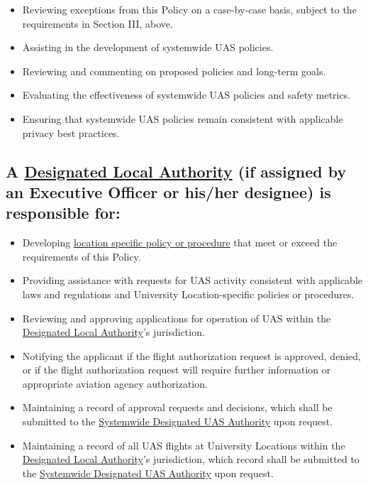 \documentclass[
]{book}
\providecommand{\tightlist}{%
  \setlength{\itemsep}{0pt}\setlength{\parskip}{0pt}}
\begin{document}
\begin{itemize}
\tightlist
\item
  Reviewing exceptions from this Policy on a case-by-case basis, subject to the requirements in Section III, above.
\item
  Assisting in the development of systemwide UAS policies.
\item
  Reviewing and commenting on proposed policies and long-term goals.
\item
  Evaluating the effectiveness of systemwide UAS policies and safety metrics.
\item
  Ensuring that systemwide UAS policies remain consistent with applicable privacy best practices.
\end{itemize}

\hypertarget{a-refdla-if-assigned-by-an-executive-officer-or-hisher-designee-is-responsible-for}{%
\subsection{A \protect\hyperlink{DLA}{Designated Local Authority} (if assigned by an Executive Officer or his/her designee) is responsible for:}\label{a-refdla-if-assigned-by-an-executive-officer-or-hisher-designee-is-responsible-for}}

\begin{itemize}
\tightlist
\item
  Developing \protect\hyperlink{LSP}{location specific policy or procedure} that meet or exceed the requirements of this Policy.
\item
  Providing assistance with requests for UAS activity consistent with applicable laws and regulations and University Location-specific policies or procedures.
\item
  Reviewing and approving applications for operation of UAS within the \protect\hyperlink{DLA}{Designated Local Authority}'s jurisdiction.
\item
  Notifying the applicant if the flight authorization request is approved, denied, or if the flight authorization request will require further information or appropriate aviation agency authorization.
\item
  Maintaining a record of approval requests and decisions, which shall be submitted to the \protect\hyperlink{SDA}{Systemwide Designated UAS Authority} upon request.
\item
  Maintaining a record of all UAS flights at University Locations within the \protect\hyperlink{DLA}{Designated Local Authority}'s jurisdiction, which record shall be submitted to the \protect\hyperlink{SDA}{Systemwide Designated UAS Authority} upon request.
\end{itemize}
\end{document}
